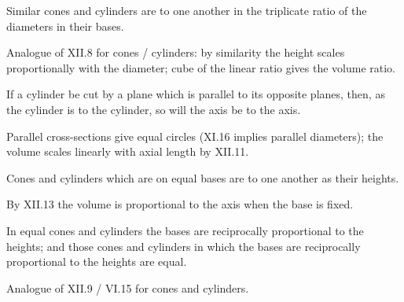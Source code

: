 \documentclass{rrxiv}
\begin{document}
\begin{claim}
\label{prop:XII.12}
Similar cones and cylinders are to one another in the triplicate
ratio of the diameters in their bases.
\end{claim}
\begin{evidence}
\label{ev:XII.12}
Analogue of XII.8 for cones / cylinders: by similarity the height
scales proportionally with the diameter; cube of the linear ratio
gives the volume ratio.
\end{evidence}

\begin{claim}
\label{prop:XII.13}
If a cylinder be cut by a plane which is parallel to its opposite
planes, then, as the cylinder is to the cylinder, so will the axis
be to the axis.
\end{claim}
\begin{evidence}
\label{ev:XII.13}
Parallel cross-sections give equal circles (XI.16 implies parallel
diameters); the volume scales linearly with axial length by XII.11.
\end{evidence}

\begin{claim}
\label{prop:XII.14}
Cones and cylinders which are on equal bases are to one another as
their heights.
\end{claim}
\begin{evidence}
\label{ev:XII.14}
By XII.13 the volume is proportional to the axis when the base is
fixed.
\end{evidence}

\begin{claim}
\label{prop:XII.15}
In equal cones and cylinders the bases are reciprocally proportional
to the heights; and those cones and cylinders in which the bases
are reciprocally proportional to the heights are equal.
\end{claim}
\begin{evidence}
\label{ev:XII.15}
Analogue of XII.9 / VI.15 for cones and cylinders.
\end{evidence}
\end{document}

